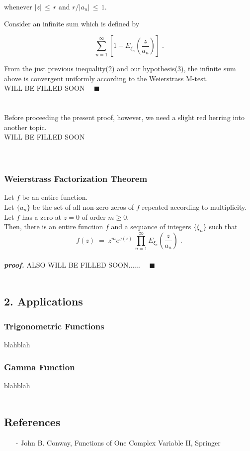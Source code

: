 whenever $ |z| \,\le\, r $ and $r/|a_n| \,\le\, 1$.

Consider an infinite sum which is defined by

$$ \sum_{n=1}^{\infty} \left[ {1 - E_{\xi_n} \left( \frac{z}{a_n} \right) } \right] \; .$$

From the just previous inequality(2) and our hypothesis(3), the infinite sum above is convergent uniformly according to the Weierstrass M-test. \\

WILL BE FILLED SOON $\quad \blacksquare$ \\ \\\\

Before proceeding the present proof, however, we need a slight red herring into another topic. \\

WILL BE FILLED SOON \\ \\ \\





\subsubsection*{Weierstrass Factorization Theorem \\[-0.6cm]}
Let $f$ be an entire function. \\
Let $\{ a_n \}$ be the set of all non-zero zeros of $f$ repeated according to multiplicity. \\
Let $f$ has a zero at $z=0$ of order $m \ge 0$. \\
Then, there is an entire function $f$ and a sequance of integers $\{\xi_n\}$ such that
$$ f(z) \;=\; z^m e^{g(z)} \, \prod_{n=1}^{\infty} E_{\xi_n} \left( \frac{z}{a_n} \right) \; . $$ \\

\textbf{\textit{proof.}} ALSO WILL BE FILLED SOON...... $\quad \blacksquare$ \\ \\

\subsection*{2. Applications}
\subsubsection*{Trigonometric Functions}
blahblah

\subsubsection*{Gamma Function}
blahblah \\ \\



\subsection*{References}
\begin{itemize}
    \item[-] John B. Conway, Functions of One Complex Variable II, Springer
\end{itemize}




